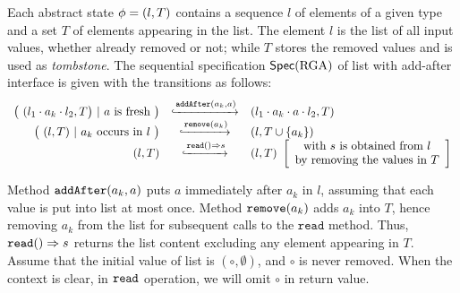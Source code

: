 \begin{example}
  \label{definition:sequential specification of rga}
  Each abstract state $\abstate = (l,T)$ contains a sequence $l$ of
  elements of a given type and a set $T$ of elements appearing in the
  list.
  The element $l$ is the list of all input values, whether already
  removed or not; while $T$ stores the removed values and is used as
  \emph{tombstone}.
  The sequential specification $\specRGA$ of list with add-after interface is
  given with the transitions as follows:
  \[
    \begin{array}{rcl}
      \big(\ (l_1 \cdot a_k \cdot l_2,T\big)\ |\ a\text{ is fresh}\ \big)
      & \specarrow{\alabelshort[\mathtt{addAfter}]{a_k,a}}
      & (l_1 \cdot a_k \cdot a \cdot l_2,T)\\
      \big(\ (l,T)\ |\ a_k\ \text{occurs in}\ l\ \big)
      & \specarrow{\alabelshort[\mathtt{remove}]{a_k}}
      & (l,T \cup \{a_k\})\\
      (l,T)
      & \specarrow{\alabellong[\mathtt{read}]{}{s}{}}
      & (l,T)\
        \left[\begin{array}{c}
                 \text{with $s$ is obtained from $l$}\\
                 \text{by removing the values in $T$}
        \end{array}\right]
 \end{array}
  \]

  Method $\alabelshort[\mathtt{addAfter}]{a_k,a}$ puts $a$ immediately
  after $a_k$ in $l$, assuming that each value is put into list at
  most once.
  Method $\alabelshort[\mathtt{remove}]{a_k}$ adds $a_k$ into $T$,
  hence removing $a_k$ from the list for subsequent calls to the
  $\mathtt{read}$ method.
  Thus, $\alabellong[\mathtt{read}]{}{s}{}$ returns the list content
  excluding any element appearing in $T$.
  Assume that the initial value of list is $(\circ,\emptyset)$, and
  $\circ$ is never removed.
  When the context is clear, in $\ensuremath{\tt read}$ operation, we
  will omit $\circ$ in return value.
\end{example}


